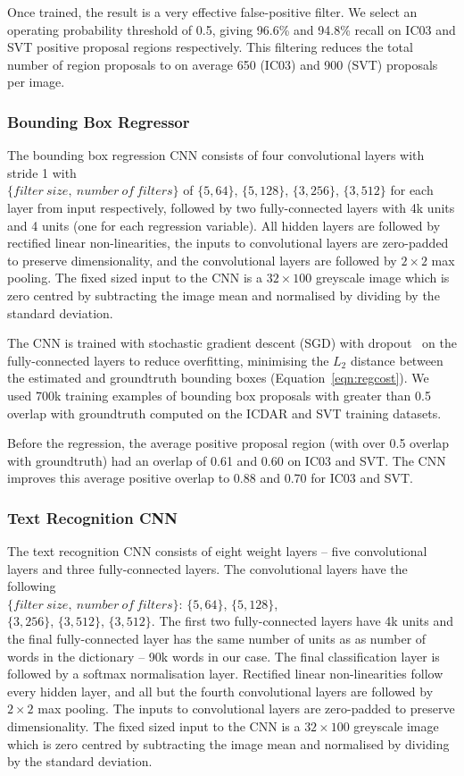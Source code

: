 \documentclass[twocolumn]{svjour3}          \smartqed  \usepackage{epsfig}
\begin{document}
Once trained, the result is a very effective false-positive filter. We select an operating probability threshold of 0.5, giving 96.6\% and 94.8\% recall on IC03 and SVT positive proposal regions respectively. This filtering reduces the total number of region proposals to on average 650 (IC03) and 900 (SVT) proposals per image. 

\subsubsection{Bounding Box Regressor}
The bounding box regression CNN consists of four convolutional layers with stride 1 with \\$\{filter~size,~number~of~filters\}$ of $\{5,64\}$, $\{5,128\}$, $\{3,256\}$, $\{3,512\}$ for each layer from input respectively, followed by two fully-connected layers with 4k units and 4 units (one for each regression variable). All hidden layers are followed by rectified linear non-linearities, the inputs to convolutional layers are zero-padded to preserve dimensionality, and the convolutional layers are followed by $2 \times 2$ max pooling. The fixed sized input to the CNN is a $32 \times 100$ greyscale image which is zero centred by subtracting the image mean and normalised by dividing by the standard deviation.

The CNN is trained with stochastic gradient descent (SGD) with dropout~\cite{Hinton12} on the fully-connected layers to reduce overfitting, minimising the $L_2$ distance between the estimated and groundtruth bounding boxes (Equation~\ref{eqn:regcost}). We used 700k training examples of bounding box proposals with greater than 0.5 overlap with groundtruth computed on the ICDAR and SVT training datasets.

Before the regression, the average positive proposal region (with over 0.5 overlap with groundtruth) had an overlap of 0.61 and 0.60 on IC03 and SVT. The CNN improves this average positive overlap to 0.88 and 0.70 for IC03 and SVT.

\subsubsection{Text Recognition CNN}
The text recognition CNN consists of eight weight layers -- five convolutional layers and three fully-connected layers. The convolutional layers have the following \\$\{filter~size,~ number~of~filters\}$: $\{5,64\}$, $\{5,128\}$, \\$\{3,256\}$, $\{3,512\}$, $\{3,512\}$. The first two fully-connected layers have 4k units and the final fully-connected layer has the same number of units as as number of words in the dictionary -- 90k words in our case. The final classification layer is followed by a softmax normalisation layer. Rectified linear non-linearities follow every hidden layer, and all but the fourth convolutional layers are followed by $2 \times 2$ max pooling. The inputs to convolutional layers are zero-padded to preserve dimensionality. The fixed sized input to the CNN is a $32 \times 100$ greyscale image which is zero centred by subtracting the image mean and normalised by dividing by the standard deviation. 
\end{document}
